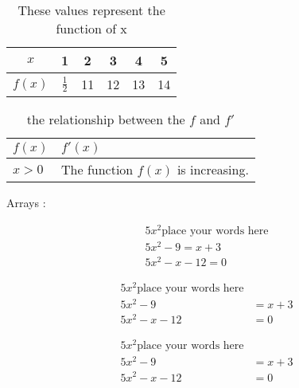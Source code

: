 \documentclass[18pt]{article}    %
\begin{document}
\begin{table}[H]       %
\centering
\def\arraystretch{1.8}   %
\begin{tabular}{|c||c|c|c|c|c|}    
\hline
$x$ & 1 & 2 & 3 & 4 & 5 \\ \hline
$f(x)$ & $\frac{1}{2}$ & 11 & 12 & 13 & 14 \\ \hline
\end{tabular}
\caption{These values represent the function of x}  %
\end{table}

\begin{table}[H]
\centering
\def\arraystretch{1.8}
\begin{tabular}{|l|p{2in}|}    %
\hline
$f(x)$ & $f'(x)$ \\ \hline
$x > 0$ & The function $f(x)$ is increasing. \\ \hline
\end{tabular}
\caption{the relationship between the $f$ and $f'$}
\end{table}

Arrays : 

\begin{align}				%
5x^2    \text{place your words here}   \\      %
5x^2-9 = x+3 \\
5x^2-x-12 = 0
\end{align}

\begin{align}				
5x^2    \text{place your words here}   \\
5x^2-9 &= x+3 \\				%
5x^2-x-12 &= 0
\end{align}

\begin{align*}				%
5x^2    \text{place your words here}   \\
5x^2-9 &= x+3 \\				
5x^2-x-12 &= 0
\end{align*}
\end{document}
